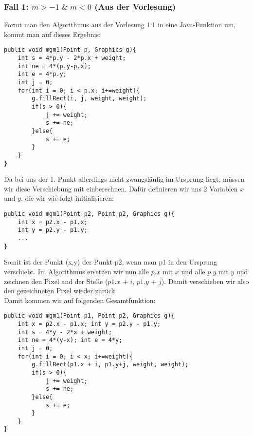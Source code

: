 \documentclass[a4paper,10pt]{article}
\begin{document}
\subsubsection{Fall 1: $m > -1 \;\&\; m < 0$ (Aus der Vorlesung)}
Formt man den Algorithmus aus der Vorlesung 1:1 in eine Java-Funktion um, kommt man auf dieses Ergebnis:
\begin{lstlisting}
public void mgm1(Point p, Graphics g){
    int s = 4*p.y - 2*p.x + weight;
    int ne = 4*(p.y-p.x);
    int e = 4*p.y;
    int j = 0;
    for(int i = 0; i < p.x; i+=weight){
        g.fillRect(i, j, weight, weight);
        if(s > 0){
            j += weight;
            s += ne;
        }else{
            s += e;
        }
    }
}
\end{lstlisting}
Da bei uns der 1. Punkt allerdings nicht zwangsläufig im Ursprung liegt, müssen wir diese Verschiebung mit einberechnen. Dafür definieren wir uns 2 Variablen $x$ und $y$, die wir wie folgt initialisieren:
\begin{lstlisting}
public void mgm1(Point p2, Point p2, Graphics g){
    int x = p2.x - p1.x;
    int y = p2.y - p1.y;
    ...
}
\end{lstlisting}
Somit ist der Punkt (x,y) der Punkt p2, wenn man p1 in den Ursprung verschiebt. Im Algorithmus ersetzen wir nun alle $p.x$ mit $x$ und alle $p.y$ mit $y$ und zeichnen den Pixel and der Stelle ($p1.x$ + $i$, $p1.y$ + $j$).
Damit verschieben wir also den gezeichneten Pixel wieder zurück.\\Damit kommen wir auf folgenden Gesamtfunktion:
\begin{lstlisting}
public void mgm1(Point p1, Point p2, Graphics g){
    int x = p2.x - p1.x; int y = p2.y - p1.y;
    int s = 4*y - 2*x + weight;
    int ne = 4*(y-x); int e = 4*y;
    int j = 0;
    for(int i = 0; i < x; i+=weight){
        g.fillRect(p1.x + i, p1.y+j, weight, weight);
        if(s > 0){
            j += weight;
            s += ne;
        }else{
            s += e;
        }
    }
} 
\end{lstlisting}
\end{document}
